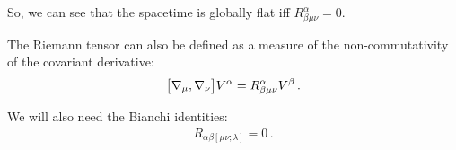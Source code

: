 \documentclass[main.tex]{subfiles}
\begin{document}
So, we can see that the spacetime is globally flat iff \(R^{\alpha }_{\beta \mu \nu } = 0\). 

The Riemann tensor can also be defined as a measure of the non-commutativity of the covariant derivative: 
%
\begin{align}
\qty[\nabla_\mu, \nabla_\nu ] V^{\alpha } = R^{\alpha }_{\beta \mu \nu } V^{\beta }
\,.
\end{align}

We will also need the Bianchi identities: 
%
\begin{align}
R_{\alpha \beta [ \mu \nu ; \lambda ]} = 0
\,.
\end{align}
\end{document}
